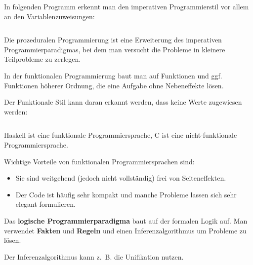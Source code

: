 \begin{beispiel}
    In folgenden Programm erkennt man den imperativen Programmierstil vor allem
    an den Variablenzuweisungen:
    \inputminted[numbersep=5pt, tabsize=4]{c}{scripts/c/fibonacci-imperativ.c}
\end{beispiel}

\begin{definition}%
    Die prozeduralen Programmierung ist eine Erweiterung des imperativen
    Programmierparadigmas, bei dem man versucht die Probleme in 
    kleinere Teilprobleme zu zerlegen.
\end{definition}

\begin{definition}%
    In der funktionalen Programmierung baut man auf Funktionen und
    ggf. Funktionen höherer Ordnung, die eine Aufgabe ohne Nebeneffekte
    lösen.
\end{definition}

\begin{beispiel}
    Der Funktionale Stil kann daran erkannt werden, dass keine Werte zugewiesen werden:
    \inputminted[numbersep=5pt, tabsize=4]{haskell}{scripts/haskell/fibonacci-akk.hs}
\end{beispiel}

Haskell ist eine funktionale Programmiersprache, C ist eine
nicht-funktionale Programmiersprache.

Wichtige Vorteile von funktionalen Programmiersprachen sind:
\begin{itemize}
    \item Sie sind weitgehend (jedoch nicht vollständig) frei von Seiteneffekten.
    \item Der Code ist häufig sehr kompakt und manche Probleme lassen
          sich sehr elegant formulieren.
\end{itemize}

\begin{definition}%
    Das \textbf{logische Programmierparadigma} baut auf der formalen Logik auf. 
    Man verwendet \textbf{Fakten} und \textbf{Regeln}
    und einen Inferenzalgorithmus um Probleme zu lösen.
\end{definition}

Der Inferenzalgorithmus kann z.~B. die Unifikation nutzen.

